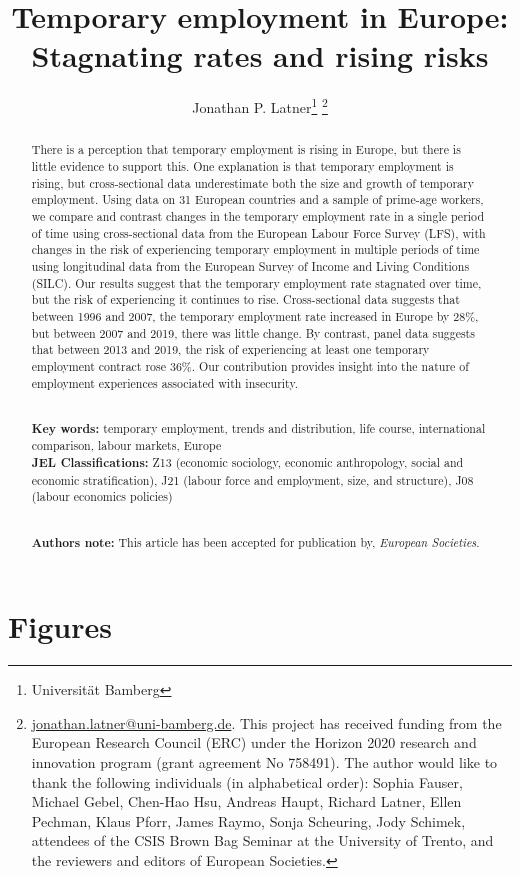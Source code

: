 \documentclass[12pt]{article}
\title{Temporary employment in Europe: Stagnating rates and rising risks}
\author{Jonathan P. Latner\thanks{Universit{\"a}t Bamberg} \footnote{\url{jonathan.latner@uni-bamberg.de}.  This project has received funding from the European Research Council (ERC) under the Horizon 2020 research and innovation program (grant agreement No 758491).  The author would like to thank the following individuals (in alphabetical order):  Sophia Fauser, Michael Gebel, Chen-Hao Hsu, Andreas Haupt, Richard Latner, Ellen Pechman, Klaus Pforr, James Raymo, Sonja Scheuring, Jody Schimek, attendees of the CSIS Brown Bag Seminar at the University of Trento, and the reviewers and editors of European Societies.}}
\date{\vspace{-5ex}}
\begin{document}
\maketitle

\begin{abstract}

\noindent 
There is a perception that temporary employment is rising in Europe, but there is little evidence to support this.  One explanation is that temporary employment is rising, but cross-sectional data underestimate both the size and growth of temporary employment.  Using data on 31 European countries and a sample of prime-age workers, we compare and contrast changes in the temporary employment rate in a single period of time using cross-sectional data from the European Labour Force Survey (LFS), with changes in the risk of experiencing temporary employment in multiple periods of time using longitudinal data from the European Survey of Income and Living Conditions (SILC).  Our results suggest that the temporary employment rate stagnated over time, but the risk of experiencing it continues to rise.  Cross-sectional data suggests that between 1996 and 2007, the temporary employment rate increased in Europe by 28\%, but between 2007 and 2019, there was little change.  By contrast, panel data suggests that between 2013 and 2019, the risk of experiencing at least one temporary employment contract rose 36\%.  Our contribution provides insight into the nature of employment experiences associated with insecurity.  

\noindent
\\
{\bf Key words:} temporary employment, trends and distribution, life course, international comparison, labour markets, Europe \\
{\bf JEL Classifications:} Z13 (economic sociology, economic anthropology, social and economic stratification), J21 (labour force and employment, size, and structure), J08 (labour economics policies)

\noindent
\\
{\bf Authors note:} This article has been accepted for publication by, \emph{European Societies}.
\end{abstract}

\clearpage
\section{Figures}

\end{document}
